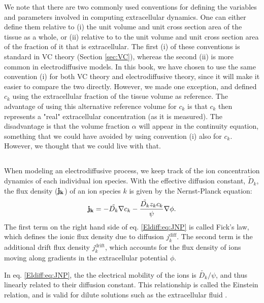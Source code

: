 We note that there are two commonly used conventions for defining the variables and parameters involved in computing extracellular dynamics. One can either define them relative to (i) the unit volume and unit cross section area of the tissue as a whole, or (ii) relative to to the unit volume and unit cross section area of the fraction of it that is extracellular. The first (i) of these conventions is standard in VC theory (Section \ref{sec:VC}), whereas the second (ii) is more common in electrodiffusive models. In this book, we have chosen to use the same convention (i) for both VC theory and electrodiffusive theory, since it will make it easier to compare the two directly. However, we made one exception, and defined $c_k$ using the extracellular fraction of the tissue volume as reference. The advantage of using this alternative reference volume for $c_k$ is that $c_k$ then represents a "real" extracellular concentration (as it is measured). The disadvantage is that the volume fraction $\alpha$ will appear in the continuity equation, something that we could have avoided by using convention (i) also for $c_k$. However, we thought that we could live with that.


\subsection{}
\label{sec:Eldiff:ionconcentrationdynamics}
When modeling an electrodiffusive process, we keep track of the ion concentration dynamics of each individual ion species. With the effective diffusion constant, $\tilde{D}_k$, the flux density (${\bf j_k}$) of an ion species $k$ is given by the Nernst-Planck equation:
\begin{equation}
{\bf j_k} = - \tilde{D_k} {\bf \nabla} c_{k} - \frac{\tilde{D_k} z_k c_k}{\psi} {\bf \nabla} \phi.
\label{Eldiff:eq:JNP}
\end{equation}
The first term on the right hand side of eq. \ref{Eldiff:eq:JNP} is called Fick's law, which defines the ionic flux density due to diffusion $j_{k}^\text{diff}$. The second term is the additional drift flux density $j_{k}^\text{drift}$, which accounts for the flux density of ions moving along gradients in the extracellular potential $\phi$.

In eq. \ref{Eldiff:eq:JNP}, the the electrical mobility of the ions is $\tilde{D_k}/\psi$, and thus linearly related to their diffusion constant. This relationship is called the Einstein relation, and is valid for dilute solutions such as the extracellular fluid \cite{Grodzinsky2011}.

